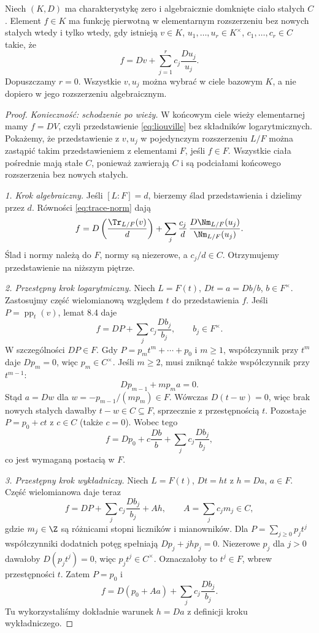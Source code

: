 \begin{twierdzenie}[Liouville'a]
Niech $(K,D)$ ma charakterystykę zero i algebraicznie domknięte ciało stałych $C$. Element $f\in K$ ma funkcję pierwotną w elementarnym rozszerzeniu bez nowych stałych wtedy i tylko wtedy, gdy istnieją $v\in K$, $u_1,\dots,u_r\in K^\times$, $c_1,\dots,c_r\in C$ takie, że
\begin{equation}\label{eq:liouville}
f=Dv+\sum_{j=1}^r c_j\frac{Du_j}{u_j}.
\end{equation}
Dopuszczamy $r=0$. Wszystkie $v,u_j$ można wybrać w ciele bazowym $K$, a nie dopiero w jego rozszerzeniu algebraicznym.
\end{twierdzenie}
\begin{proof}
\emph{Konieczność: schodzenie po wieży.} W końcowym ciele wieży elementarnej mamy $f=DV$, czyli przedstawienie \eqref{eq:liouville} bez składników logarytmicznych. Pokażemy, że przedstawienie z $v,u_j$ w pojedynczym rozszerzeniu $L/F$ można zastąpić takim przedstawieniem z elementami $F$, jeśli $f\in F$. Wszystkie ciała pośrednie mają stałe $C$, ponieważ zawierają $C$ i są podciałami końcowego rozszerzenia bez nowych stałych.

\emph{1. Krok algebraiczny.} Jeśli $[L:F]=d$, bierzemy ślad przedstawienia i dzielimy przez $d$. Równości \eqref{eq:trace-norm} dają
\[
f=D\left(\frac{\Tr_{L/F}(v)}{d}\right)
+\sum_j\frac{c_j}{d}\,
\frac{D\Nm_{L/F}(u_j)}{\Nm_{L/F}(u_j)}.
\]
Ślad i normy należą do $F$, normy są niezerowe, a $c_j/d\in C$. Otrzymujemy przedstawienie na niższym piętrze.

\emph{2. Przestępny krok logarytmiczny.} Niech $L=F(t)$, $Dt=a=Db/b$, $b\in F^\times$. Zastosujmy część wielomianową względem $t$ do przedstawienia $f$. Jeśli $P=\operatorname{pp}_t(v)$, lemat 8.4 daje
\[
f=DP+\sum_j c_j\frac{Db_j}{b_j},\qquad b_j\in F^\times.
\]
W szczególności $DP\in F$. Gdy $P=p_mt^m+\cdots+p_0$ i $m\ge1$, współczynnik przy $t^m$ daje $Dp_m=0$, więc $p_m\in C^\times$. Jeśli $m\ge2$, musi zniknąć także współczynnik przy $t^{m-1}$:
\[
Dp_{m-1}+m p_ma=0.
\]
Stąd $a=Dw$ dla $w=-p_{m-1}/(mp_m)\in F$. Wówczas $D(t-w)=0$, więc brak nowych stałych dawałby $t-w\in C\subseteq F$, sprzecznie z przestępnością $t$. Pozostaje $P=p_0+ct$ z $c\in C$ (także $c=0$). Wobec tego
\[
f=Dp_0+c\frac{Db}{b}+\sum_j c_j\frac{Db_j}{b_j},
\]
co jest wymaganą postacią w $F$.

\emph{3. Przestępny krok wykładniczy.} Niech $L=F(t)$, $Dt=ht$ z $h=Da$, $a\in F$. Część wielomianowa daje teraz
\[
f=DP+\sum_j c_j\frac{Db_j}{b_j}+Ah,\qquad A=\sum_j c_jm_j\in C,
\]
gdzie $m_j\in\Z$ są różnicami stopni liczników i mianowników. Dla $P=\sum_{j\ge0}p_jt^j$ współczynniki dodatnich potęg spełniają $Dp_j+jhp_j=0$. Niezerowe $p_j$ dla $j>0$ dawałoby $D(p_jt^j)=0$, więc $p_jt^j\in C^\times$. Oznaczałoby to $t^j\in F$, wbrew przestępności $t$. Zatem $P=p_0$ i
\[
f=D(p_0+Aa)+\sum_j c_j\frac{Db_j}{b_j}.
\]
Tu wykorzystaliśmy dokładnie warunek $h=Da$ z definicji kroku wykładniczego.


\end{proof}
